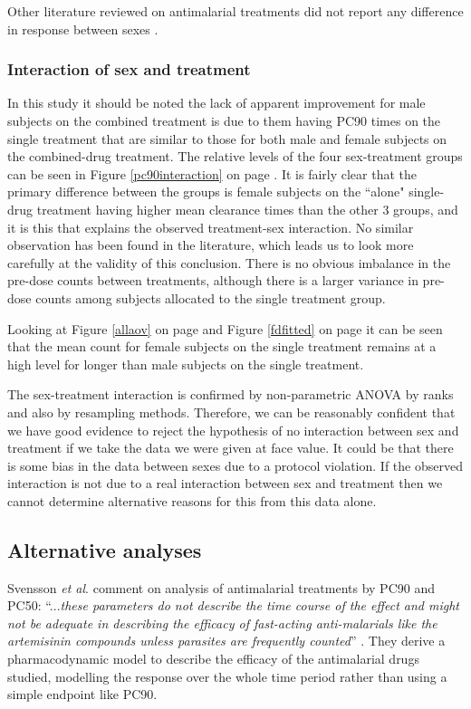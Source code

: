 Other literature reviewed on antimalarial treatments did not report any difference in response between sexes \cite{newton, vries, carmello}.

\subsubsection*{Interaction of sex and treatment}
In this study it should be noted the lack of apparent improvement for male subjects on the combined treatment is due to them having PC90 times on the single treatment that are similar to those for both male and female subjects on the combined-drug treatment. The relative levels of the four sex-treatment groups can be seen in Figure \ref{pc90interaction} on page \pageref{pc90interaction}. It is fairly clear that the primary difference between the groups is female subjects on the ``alone" single-drug treatment having higher mean clearance times than the other 3 groups, and it is this that explains the observed treatment-sex interaction. No similar observation has been found in the literature, which leads us to look more carefully at the validity of this conclusion. There is no obvious imbalance in the pre-dose counts between treatments, although there is a larger variance in pre-dose counts among subjects allocated to the single treatment group.

Looking at Figure \ref{allaov} on page \pageref{allaov} and Figure \ref{fdfitted} on page \pageref{fdfitted} it can be seen that the mean count for female subjects on the single treatment remains at a high level for longer than male subjects on the single treatment.

The sex-treatment interaction is confirmed by non-parametric ANOVA by ranks and also by resampling methods.
Therefore, we can be reasonably confident that we have good evidence to reject the hypothesis of no interaction between sex and treatment if we take the data we were given at face value. It could be that there is some bias in the data between sexes due to a protocol violation. If the observed interaction is not due to a real interaction between sex and treatment then we cannot determine alternative reasons for this from this data alone.

\subsection{Alternative analyses}
Svensson {\it et al}.  comment on analysis of antimalarial treatments by PC90 and PC50: ``...\textit{these parameters do not 
describe the time course of the effect and might not be adequate in describing the efficacy of fast-acting anti-malarials like the artemisinin compounds unless parasites are frequently counted}'' \cite{svensson}. They derive a pharmacodynamic model to describe the efficacy of the antimalarial drugs studied, modelling the response over the whole time period rather than using a simple endpoint like PC90.

